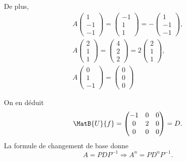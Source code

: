De plus,
\begin{multline*}
  A\begin{pmatrix}
     1 \\ -1 \\-1
   \end{pmatrix}
= \begin{pmatrix}
     -1 \\ 1 \\1
   \end{pmatrix} = -\begin{pmatrix}
     1 \\ -1 \\-1
   \end{pmatrix},\\
   A\begin{pmatrix}
     2 \\ 1 \\1
   \end{pmatrix}
= \begin{pmatrix}
     4 \\ 2 \\ 2
   \end{pmatrix} = 2\begin{pmatrix}
     2 \\ 1 \\ 1
   \end{pmatrix},\\  
   A\begin{pmatrix}
     0 \\ 1 \\ -1
   \end{pmatrix}
= \begin{pmatrix}
     0 \\ 0 \\ 0
   \end{pmatrix}
\end{multline*}

On en déduit 
\[
  \MatB{U}{f}=
  \begin{pmatrix}
    -1 & 0 & 0 \\ 0 & 2 & 0 \\ 0 & 0 & 0
  \end{pmatrix} = D.
\]
La formule de changement de base donne
\[
  A = P D P^{-1}\Rightarrow A^n = P D^n P^{-1}.
\]

